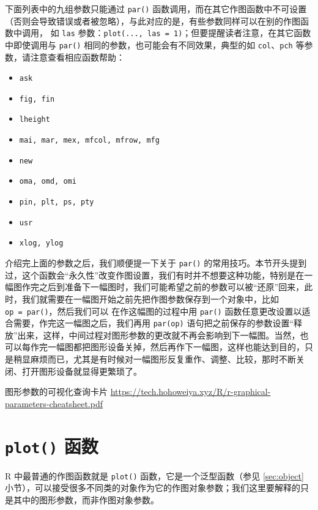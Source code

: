 \documentclass[
  b5paper,
  UTF8,twoside]{book}
\providecommand{\tightlist}{%
  \setlength{\itemsep}{0pt}\setlength{\parskip}{0pt}}
\begin{document}
下面列表中的九组参数只能通过 \texttt{par()} 函数调用，而在其它作图函数中不可设置（否则会导致错误或者被忽略），与此对应的是，有些参数同样可以在别的作图函数中调用， 如 \texttt{las} 参数：\texttt{plot(...,\ las\ =\ 1)}；但要提醒读者注意，在其它函数中即使调用与 \texttt{par()} 相同的参数，也可能会有不同效果，典型的如 \texttt{col}、\texttt{pch} 等参数，请注意查看相应函数帮助：

\begin{itemize}
\tightlist
\item
  \texttt{ask}
\item
  \texttt{fig,\ fin}
\item
  \texttt{lheight}
\item
  \texttt{mai,\ mar,\ mex,\ mfcol,\ mfrow,\ mfg}
\item
  \texttt{new}
\item
  \texttt{oma,\ omd,\ omi}
\item
  \texttt{pin,\ plt,\ ps,\ pty}
\item
  \texttt{usr}
\item
  \texttt{xlog,\ ylog}
\end{itemize}

介绍完上面的参数之后，我们顺便提一下关于 \texttt{par()} 的常用技巧。本节开头提到过，这个函数会``永久性''改变作图设置，我们有时并不想要这种功能，特别是在一幅图作完之后到准备下一幅图时，我们可能希望之前的参数可以被``还原''回来，此时，我们就需要在一幅图开始之前先把作图参数保存到一个对象中，比如 \texttt{op\ =\ par()}，然后我们可以 在作这幅图的过程中用 \texttt{par()} 函数任意更改设置以适合需要，作完这一幅图之后，我们再用 \texttt{par(op)} 语句把之前保存的参数设置``释放''出来，这样，中间过程对图形参数的更改就不再会影响到下一幅图。当然，也可以每作完一幅图都把图形设备关掉，然后再作下一幅图，这样也能达到目的，只是稍显麻烦而已，尤其是有时候对一幅图形反复重作、调整、比较，那时不断关闭、打开图形设备就显得更繁琐了。

图形参数的可视化查询卡片 \url{https://tech.hohoweiya.xyz/R/r-graphical-parameters-cheatsheet.pdf}

\section{\texorpdfstring{\texttt{plot()} 函数}{plot() 函数}}\label{sec:plot}

R 中最普通的作图函数就是 \texttt{plot()} 函数，它是一个泛型函数（参见 \ref{sec:object} 小节），可以接受很多不同类的对象作为它的作图对象参数；我们这里要解释的只是其中的图形参数，而非作图对象参数。
\end{document}
